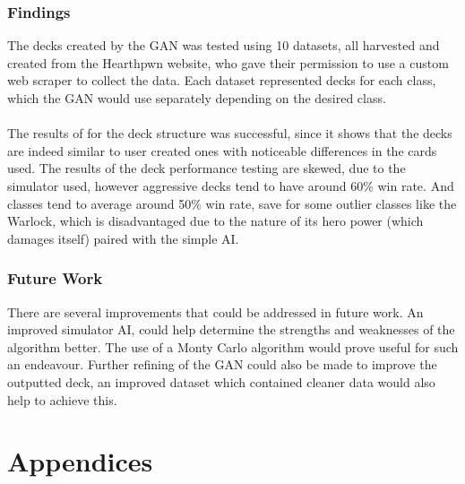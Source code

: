 \documentclass{report} %
\begin{document}
\subsection{Findings}
The decks created by the GAN was tested using 10 datasets, all harvested and created from the Hearthpwn website, who gave their permission to use a custom web scraper to collect the data. Each dataset represented decks for each class, which the GAN would use separately depending on the desired class. \\
\\
The results of for the deck structure was successful, since it shows that the decks are indeed similar to user created ones with noticeable differences in the cards used. The results of the deck performance testing are skewed, due to the simulator used, however aggressive decks tend to have around 60\% win rate. And classes tend to average around 50\% win rate, save for some outlier classes like the Warlock, which is disadvantaged due to the nature of its hero power (which damages itself) paired with the simple AI.
\subsection{Future Work}
There are several improvements that could be addressed in future work. An improved simulator AI, could help determine the strengths and weaknesses of the algorithm better. The use of a Monty Carlo algorithm would prove useful for such an endeavour. Further refining of the GAN could also be made to improve the outputted deck, an improved dataset which contained cleaner data would also help to achieve this.







\chapter{Appendices}
\end{document}
